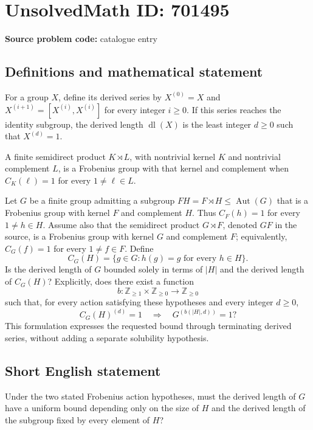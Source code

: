 \documentclass[11pt]{article}
\begin{document}
\section*{UnsolvedMath ID: 701495}
\textbf{Source problem code:} catalogue entry
\subsection{Definitions and mathematical statement}
For a group \(X\), define its derived series by \(X^{(0)}=X\) and \(X^{(i+1)}=[X^{(i)},X^{(i)}]\) for every integer \(i\geq 0\). If this series reaches the identity subgroup, the derived length \(\operatorname{dl}(X)\) is the least integer \(d\geq 0\) such that \(X^{(d)}=1\).

A finite semidirect product \(K\rtimes L\), with nontrivial kernel \(K\) and nontrivial complement \(L\), is a Frobenius group with that kernel and complement when \(C_K(\ell)=1\) for every \(1\neq\ell\in L\).

Let \(G\) be a finite group admitting a subgroup \(FH=F\rtimes H\leq\operatorname{Aut}(G)\) that is a Frobenius group with kernel \(F\) and complement \(H\). Thus \(C_F(h)=1\) for every \(1\neq h\in H\). Assume also that the semidirect product \(G\rtimes F\), denoted \(GF\) in the source, is a Frobenius group with kernel \(G\) and complement \(F\); equivalently, \(C_G(f)=1\) for every \(1\neq f\in F\). Define
\[
C_G(H)=\{g\in G: h(g)=g\text{ for every }h\in H\}.
\]
Is the derived length of \(G\) bounded solely in terms of \(|H|\) and the derived length of \(C_G(H)\)? Explicitly, does there exist a function
\[
b:\mathbb Z_{\geq 1}\times\mathbb Z_{\geq 0}\longrightarrow\mathbb Z_{\geq 0}
\]
such that, for every action satisfying these hypotheses and every integer \(d\geq 0\),
\[
C_G(H)^{(d)}=1\quad\Longrightarrow\quad G^{(b(|H|,d))}=1?
\]
This formulation expresses the requested bound through terminating derived series, without adding a separate solubility hypothesis.
\subsection{Short English statement}
Under the two stated Frobenius action hypotheses, must the derived length of \(G\) have a uniform bound depending only on the size of \(H\) and the derived length of the subgroup fixed by every element of \(H\)?
\end{document}

